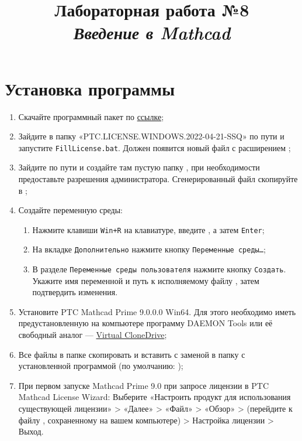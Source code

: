 \documentclass[14pt,a4paper]{article}
\title{Лабораторная работа №8 \\ \textit{Введение в Mathcad}}
\begin{document}
\maketitle

\progress{}
\section{Установка программы}
\begin{enumerate}
	\item Скачайте программный пакет по \href{https://mega.nz/folder/BJVHALjD#w-peT3ym3XjbBn78NVb9OA}{ссылке};
	\item Зайдите в папку «PTC.LICENSE.WINDOWS.2022-04-21-SSQ» по пути 
    и запустите \texttt{FillLicense.bat}. Должен появится новый файл с расширением ;
	\item Зайдите по пути  и создайте там пустую папку , при необходимости предоставьте разрешения администратора. Сгенерированный файл  скопируйте в ;
	\item Создайте переменную среды:
	\begin{enumerate}
		\item Нажмите клавиши \texttt{Win+R} на клавиатуре, введите , а затем \texttt{Enter};
		\item На вкладке \texttt{Дополнительно} нажмите кнопку \texttt{Переменные среды…};
		\item В разделе \texttt{Переменные среды пользователя} нажмите кнопку \texttt{Создать}. Укажите имя переменной  и путь к исполняемому файлу , затем подтвердить изменения.
	\end{enumerate}
	\item Установите PTC Mathcad Prime 9.0.0.0 Win64. Для этого необходимо иметь предустановленную на компьютере программу DAEMON Tools или её свободный аналог --- \href{https://www.elby.ch/products/vcd.html}{Virtual CloneDrive};
	\item Все файлы в папке  скопировать и вставить с заменой в папку с установленной программой (по умолчанию: );
	\item При первом запуске Mathcad Prime 9.0 при запросе лицензии в PTC Mathcad License Wizard: Выберите «Настроить продукт для использования существующей лицензии» > «Далее» > «Файл» > «Обзор» > (перейдите к файлу , сохраненному на вашем компьютере) > Настройка лицензии > Выход.
\end{enumerate}
\end{document}
